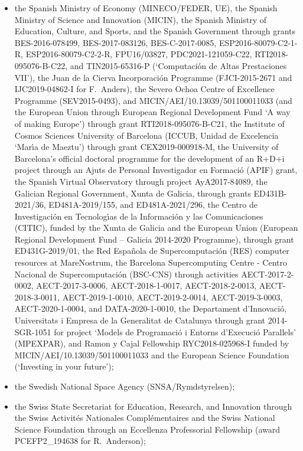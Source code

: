 \documentclass[longauth]{aa}
\begin{document}
\begin{appendix}
\begin{itemize}
\item the Spanish Ministry of Economy (MINECO/FEDER, UE), the Spanish Ministry of Science and Innovation (MICIN), the Spanish Ministry of Education, Culture, and Sports, and the Spanish Government through grants BES-2016-078499, BES-2017-083126, BES-C-2017-0085, ESP2016-80079-C2-1-R, ESP2016-80079-C2-2-R, FPU16/03827, PDC2021-121059-C22, RTI2018-095076-B-C22, and TIN2015-65316-P (`Computaci\'{o}n de Altas Prestaciones VII'), the Juan de la Cierva Incorporaci\'{o}n Programme (FJCI-2015-2671 and IJC2019-04862-I for F.~Anders), the Severo Ochoa Centre of Excellence Programme (SEV2015-0493), and MICIN/AEI/10.13039/501100011033 (and the European Union through European Regional Development Fund `A way of making Europe') through grant RTI2018-095076-B-C21, the Institute of Cosmos Sciences University of Barcelona (ICCUB, Unidad de Excelencia `Mar\'{\i}a de Maeztu’) through grant CEX2019-000918-M, the University of Barcelona's official doctoral programme for the development of an R+D+i project through an Ajuts de Personal Investigador en Formaci\'{o} (APIF) grant, the Spanish Virtual Observatory through project AyA2017-84089, the Galician Regional Government, Xunta de Galicia, through grants ED431B-2021/36, ED481A-2019/155, and ED481A-2021/296, the Centro de Investigaci\'{o}n en Tecnolog\'{\i}as de la Informaci\'{o}n y las Comunicaciones (CITIC), funded by the Xunta de Galicia and the European Union (European Regional Development Fund -- Galicia 2014-2020 Programme), through grant ED431G-2019/01, the Red Espa\~{n}ola de Supercomputaci\'{o}n (RES) computer resources at MareNostrum, the Barcelona Supercomputing Centre - Centro Nacional de Supercomputaci\'{o}n (BSC-CNS) through activities AECT-2017-2-0002, AECT-2017-3-0006, AECT-2018-1-0017, AECT-2018-2-0013, AECT-2018-3-0011, AECT-2019-1-0010, AECT-2019-2-0014, AECT-2019-3-0003, AECT-2020-1-0004, and DATA-2020-1-0010, the Departament d'Innovaci\'{o}, Universitats i Empresa de la Generalitat de Catalunya through grant 2014-SGR-1051 for project `Models de Programaci\'{o} i Entorns d'Execuci\'{o} Parallels' (MPEXPAR), and Ramon y Cajal Fellowship RYC2018-025968-I funded by MICIN/AEI/10.13039/501100011033 and the European Science Foundation (`Investing in your future');
\item the Swedish National Space Agency (SNSA/Rymdstyrelsen);
\item the Swiss State Secretariat for Education, Research, and Innovation through the Swiss Activit\'{e}s Nationales Compl\'{e}mentaires and the Swiss National Science Foundation through an Eccellenza Professorial Fellowship (award PCEFP2\_194638 for R.~Anderson);

\end{itemize}
\end{appendix}
\end{document}
